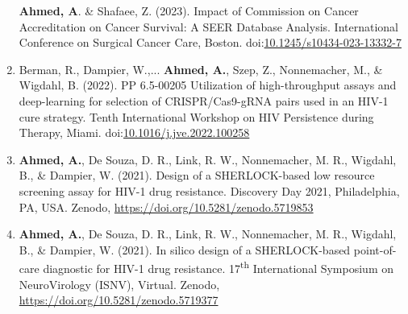 \documentclass[letterpaper,11pt]{article}
\newcommand{\resumeItem}[2]{
  \item\small{
    \textbf{#1}{#2 \vspace{-2pt}}
  }
}
\newcommand{\resumeSubItem}[2]{\resumeItem{#1}{#2}\vspace{-4pt}}
\newcommand{\resumeSubHeadingListStart}{\begin{itemize}[leftmargin=*,rightmargin=\dimexpr\linewidth-0.9\textwidth-\leftmargin\relax]}
\newcommand{\resumeSubHeadingListEnd}{\end{itemize}}
\begin{document}
\begin{enumerate}[leftmargin=*]
    {\textbf{Ahmed, A}. \& Shafaee, Z. (2023). Impact of Commission on Cancer Accreditation on Cancer Survival: A SEER Database Analysis. International Conference on Surgical Cancer Care, Boston. doi:\href{https://doi.org/10.1245/s10434-023-13332-7}{10.1245/s10434-023-13332-7}}
  \resumeSubItem{}
    {Berman, R., Dampier, W.,... \textbf{Ahmed, A.}, Szep, Z., Nonnemacher, M., \& Wigdahl, B. (2022). PP 6.5-00205 Utilization of high-throughput assays and deep-learning for selection of CRISPR/Cas9-gRNA pairs used in an HIV-1 cure strategy. Tenth International Workshop on HIV Persistence during Therapy, Miami. doi:\href{https://doi.org/10.1016/j.jve.2022.100258}{10.1016/j.jve.2022.100258}}
  \resumeSubItem{}
    {\textbf{Ahmed, A.}, De Souza, D. R., Link, R. W., Nonnemacher, M. R., Wigdahl, B., \& Dampier, W. (2021). Design of a SHERLOCK-based low resource screening assay for HIV-1 drug resistance. Discovery Day 2021, Philadelphia, PA, USA. Zenodo, \href{https://doi.org/10.5281/zenodo.5719853}{https://doi.org/10.5281/zenodo.5719853}}
  \resumeSubItem{}
    {\textbf{Ahmed, A.}, De Souza, D. R., Link, R. W., Nonnemacher, M. R., Wigdahl, B., \& Dampier, W. (2021). In silico design of a SHERLOCK-based point-of-care diagnostic for HIV-1 drug resistance. 17\textsuperscript{th} International Symposium on NeuroVirology (ISNV), Virtual. Zenodo, \href{https://doi.org/10.5281/zenodo.5719377}{https://doi.org/10.5281/zenodo.5719377}}
  \end{enumerate}

\iffalse
\section{Projects (Clickable)}
  \resumeSubHeadingListStart
    \resumeSubItem{\href{https://ahmed.science}{Website}: }
      {Designed a personal portfolio using the Django Python framework.}
    \resumeSubItem{\href{https://github.com/ArmaanAhmed22/CompareCoCversusNonCoC}{Hospital Accreditation Comparison}: }
      {Comparison of survival rates between hospitals with and without CoC accreditation.}
    \resumeSubItem{\href{https://github.com/ArmaanAhmed22/VariabilityAnalyzer}{Variability Analyzer}: }
      {Tool to analyze variability and entropy of genomic sequences}
    \resumeSubItem{\href{https://github.com/ArmaanAhmed22/NonSpecificLAMPDesign}{LAMP primer design for quasispecies amplification}: }
      {Designed a system to generate sensitive LAMP primers, able to overcome target variability.}
    \resumeSubItem{\href{https://github.com/ArmaanAhmed22/ReactionMechanizer}{ReactionMechanizer}: }
      {Created a program to simulate chemical reactions and analyze kinetics.}
  \resumeSubHeadingListEnd
\fi
%
\end{document}
